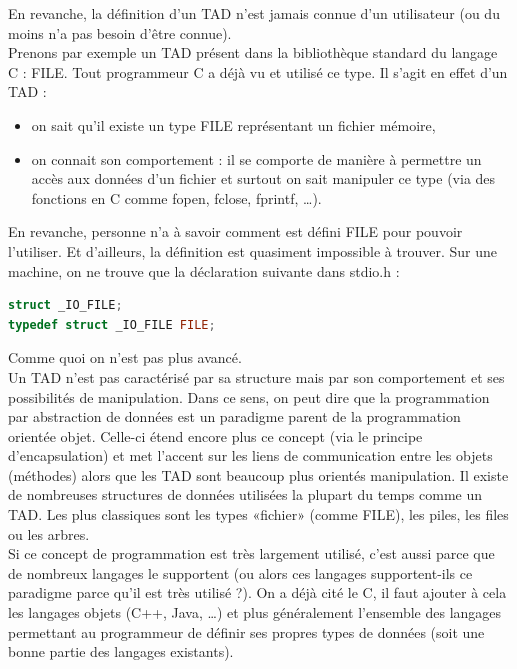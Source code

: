 En revanche, la définition d'un TAD n'est jamais connue d'un utilisateur (ou du moins n'a pas besoin d'être connue).\\

Prenons par exemple un TAD présent dans la bibliothèque standard du langage C : FILE.
Tout programmeur C a déjà vu et utilisé ce type. Il s'agit en effet d'un TAD :
\begin{itemize}
\item on sait qu'il existe un type FILE représentant un fichier mémoire,
\item on connait son comportement : il se comporte de manière à permettre un accès aux données d'un fichier et surtout on sait manipuler ce type (via des fonctions en C comme fopen, fclose, fprintf, …).\\
\end{itemize}

En revanche, personne n'a à savoir comment est défini FILE pour pouvoir l'utiliser. Et d'ailleurs, la définition est quasiment impossible à trouver. Sur une machine, on ne trouve que la déclaration suivante dans stdio.h :

\begin{lstlisting}[language=c]
struct _IO_FILE;
typedef struct _IO_FILE FILE;
\end{lstlisting}

Comme quoi on n'est pas plus avancé.\\

Un TAD n'est pas caractérisé par sa structure mais par son comportement et ses possibilités de manipulation. Dans ce sens, on peut dire que la programmation par abstraction de données est un paradigme parent de la programmation orientée objet. Celle-ci étend encore plus ce concept (via le principe d'encapsulation) et met l'accent sur les liens de communication entre les objets (méthodes) alors que les TAD sont beaucoup plus orientés manipulation. Il existe de nombreuses structures de données utilisées la plupart du temps comme un TAD. Les plus classiques sont les types «fichier» (comme FILE), les piles, les files ou les arbres.\\

Si ce concept de programmation est très largement utilisé, c'est aussi parce que de nombreux langages le supportent (ou alors ces langages supportent-ils ce paradigme parce qu'il est très utilisé ?). On a déjà cité le C, il faut ajouter à cela les langages objets (C++, Java, …) et plus généralement l'ensemble des langages permettant au programmeur de définir ses propres types de données (soit une bonne partie des langages existants). \cite{bib_univnc}

